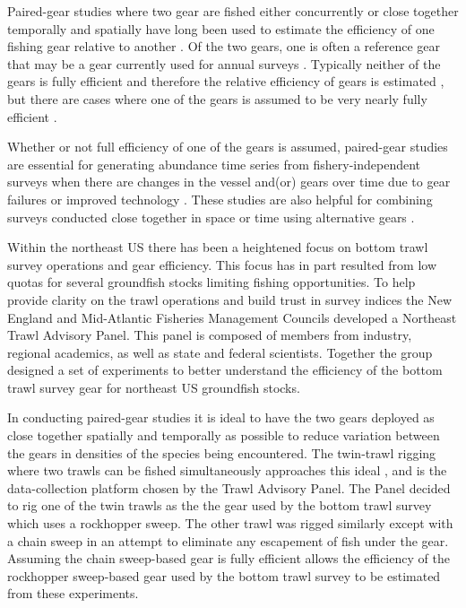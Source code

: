 \documentclass[
  12pt,
]{article}
\begin{document}
Paired-gear studies where two gear are fished either concurrently or
close together temporally and spatially have long been used to estimate
the efficiency of one fishing gear relative to another
\citep[e.g.,][]{gulland64,bourne65}. Of the two gears, one is often a
reference gear that may be a gear currently used for annual surveys
\citep[e.g.,][]{munrosomerton01}. Typically neither of the gears is
fully efficient and therefore the relative efficiency of gears is
estimated \citep[e.g.,][]{miller13,kotwickietal17}, but there are cases
where one of the gears is assumed to be very nearly fully efficient
\citep[e.g.,][]{somertonetal13, milleretal19}.

Whether or not full efficiency of one of the gears is assumed,
paired-gear studies are essential for generating abundance time series
from fishery-independent surveys when there are changes in the vessel
and(or) gears over time due to gear failures or improved technology
\citep{pelletier98}. These studies are also helpful for combining
surveys conducted close together in space or time using alternative
gears \citep{kotwickietal13}.

Within the northeast US there has been a heightened focus on bottom
trawl survey operations and gear efficiency. This focus has in part
resulted from low quotas for several groundfish stocks limiting fishing
opportunities. To help provide clarity on the trawl operations and build
trust in survey indices the New England and Mid-Atlantic Fisheries
Management Councils developed a Northeast Trawl Advisory Panel. This
panel is composed of members from industry, regional academics, as well
as state and federal scientists. Together the group designed a set of
experiments to better understand the efficiency of the bottom trawl
survey gear for northeast US groundfish stocks.

In conducting paired-gear studies it is ideal to have the two gears
deployed as close together spatially and temporally as possible to
reduce variation between the gears in densities of the species being
encountered. The twin-trawl rigging \citep{kragetal15} where two trawls
can be fished simultaneously approaches this ideal \citep{ices96}, and
is the data-collection platform chosen by the Trawl Advisory Panel. The
Panel decided to rig one of the twin trawls as the the gear used by the
bottom trawl survey which uses a rockhopper sweep. The other trawl was
rigged similarly except with a chain sweep in an attempt to eliminate
any escapement of fish under the gear. Assuming the chain sweep-based
gear is fully efficient allows the efficiency of the rockhopper
sweep-based gear used by the bottom trawl survey to be estimated from
these experiments.
\end{document}
